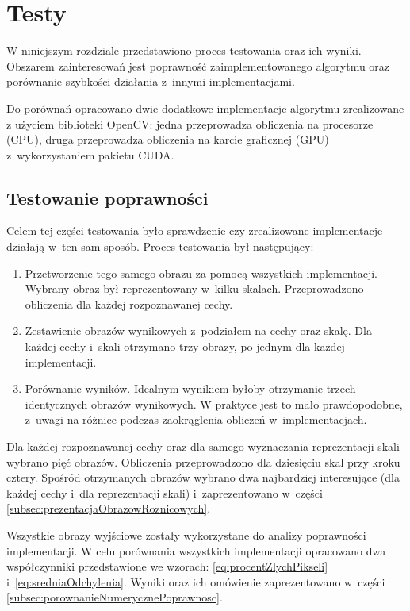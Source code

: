 \chapter{Testy}
\label{cha:testy}

W niniejszym rozdziale przedstawiono proces testowania oraz ich wyniki. Obszarem zainteresowań jest poprawność zaimplementowanego algorytmu oraz porównanie szybkości działania z~innymi implementacjami.

Do porównań opracowano dwie dodatkowe implementacje algorytmu zrealizowane z użyciem biblioteki OpenCV: jedna przeprowadza obliczenia na procesorze (CPU), druga przeprowadza obliczenia na karcie graficznej (GPU) z~wykorzystaniem pakietu CUDA.

\section{Testowanie poprawności}
\label{sec:testPoprawnosc}

Celem tej części testowania było sprawdzenie czy zrealizowane implementacje działają w~ten sam sposób. Proces testowania był następujący:

\begin{enumerate}
\item Przetworzenie tego samego obrazu za pomocą wszystkich implementacji. Wybrany obraz był reprezentowany w~kilku skalach. Przeprowadzono obliczenia dla każdej rozpoznawanej cechy.
\item Zestawienie obrazów wynikowych z~podziałem na cechy oraz skalę. Dla każdej cechy i~skali otrzymano trzy obrazy, po jednym dla każdej implementacji.
\item Porównanie wyników. Idealnym wynikiem byłoby otrzymanie trzech identycznych obrazów wynikowych. W praktyce jest to mało prawdopodobne, z~uwagi na różnice podczas zaokrąglenia obliczeń w~implementacjach.
\end{enumerate}

Dla każdej rozpoznawanej cechy oraz dla samego wyznaczania reprezentacji skali wybrano pięć obrazów. Obliczenia przeprowadzono dla dziesięciu skal przy kroku cztery. Spośród otrzymanych obrazów wybrano dwa najbardziej interesujące (dla każdej cechy i~dla reprezentacji skali) i~zaprezentowano w~części \ref{subsec:prezentacjaObrazowRoznicowych}.

Wszystkie obrazy wyjściowe zostały wykorzystane do analizy poprawności implementacji. W celu porównania wszystkich implementacji opracowano dwa współczynniki przedstawione we wzorach: \ref{eq:procentZlychPikseli} i~\ref{eq:sredniaOdchylenia}. Wyniki oraz ich omówienie zaprezentowano w~części \ref{subsec:porownanieNumerycznePoprawnosc}.

